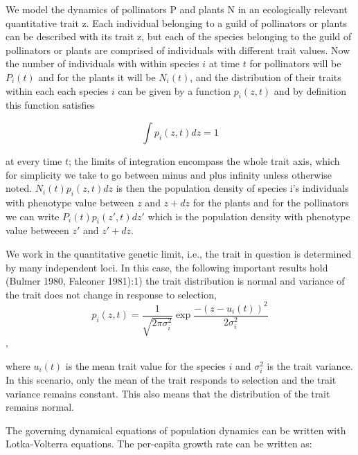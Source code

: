 \documentclass{elsarticle}
\begin{document}
We model the dynamics of pollinators P and plants N in an ecologically relevant quantitative trait z. Each individual belonging to a guild of pollinators or plants can be described with its trait z, but each of the species belonging to the guild of pollinators or plants are comprised of individuals with different trait values. Now the number of individuals with within species $i$ at time $t$ for pollinators will be $P_i(t)$ and for the plants it will be $N_i(t)$, and the distribution of their traits within each each species $i$ can be given by a function $p_i(z,t)$ and by definition this function satisfies 

$$ \int p_i(z,t) dz = 1 $$

at every time $t$; the limits of integration encompass the whole trait axis, which for simplicity we take to go between minus and plus infinity unless otherwise noted. $N_i(t)p_i(z,t)dz$ is
then the population density of species i’s individuals with phenotype value between $z$ and $z + dz$ for the plants and for the pollinators we can write $P_i(t)p_i(z',t)dz'$ which is the population density with phenotype value betweeen $z'$ and $z'+dz$.

We work in the quantitative genetic limit, i.e., the trait in question is determined by many independent loci. In this case, the following important results hold (Bulmer 1980, Falconer 1981):1) the trait distribution is normal and variance of the trait does not change in response to selection, 
$$ p_i(z,t) = \frac{1}{\sqrt{2\pi\sigma_i^2}}\exp{\frac{-(z-u_i(t))^2}{2\sigma_i^2} }$$,

where $u_i(t)$ is the mean trait value for the species $i$ and $\sigma_i^2$ is the trait variance. In this scenario, only the mean of the trait responds to selection and the trait variance remains constant. This also means that the distribution of the trait remains normal.

The governing dynamical equations of population dynamics can be written with Lotka-Volterra equations. The per-capita growth rate can be written as:
\end{document}
